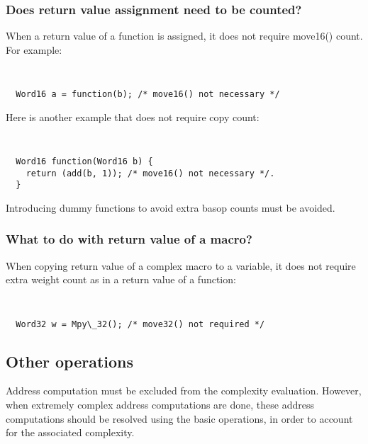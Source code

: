 \subsubsection{Does return value assignment need to be counted?}
When a return value of a function is assigned, it does not require
move16() count. For example:
{\tt\small
\begin{verbatim}
  Word16 a = function(b); /* move16() not necessary */
\end{verbatim}
}%
Here is another example that does not require copy count:
{\tt\small
\begin{verbatim}
  Word16 function(Word16 b) {
    return (add(b, 1)); /* move16() not necessary */.
  }
\end{verbatim}
}%

Introducing dummy functions to avoid extra basop
counts must be avoided. %
% 

\subsubsection{What to do with return value of a macro?}
When copying return value of a complex macro to a variable, it does
not require extra weight count as in a return value of a function:
{\tt\small
\begin{verbatim}
  Word32 w = Mpy\_32(); /* move32() not required */
\end{verbatim}
} %

\subsection{Other operations}

Address computation must be excluded from the complexity
evaluation. However, when extremely complex address computations
are done, these address computations should be resolved using the
basic operations, in order to account for the associated
complexity.

